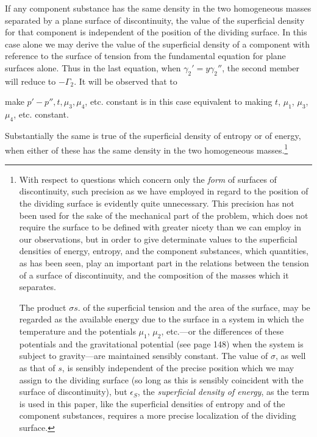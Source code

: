 \documentclass[12pt]{article}
\begin{document}
{If any component substance has the same density in the two homogeneous masses separated by a plane surface of discontinuity, the value of the superficial density for that component is independent of the position of the dividing surface. In this case alone we may derive the value of the superficial density of a component with reference to the surface of tension from the fundamental equation for plane surfaces alone. Thus in the last equation, when $\gamma_2'=y\gamma_2''$, the second member will reduce to $- \Gamma_{2}$. It will be observed that to



make $p'-p'',t,\mu_3,\mu_4$, etc. constant is in this case equivalent to making $t$, $\mu_1$, $\mu_3$, $\mu_4$, etc. constant.

Substantially the same is true of the superficial density of entropy or of energy, when either of these has the same density in the two
homogeneous masses.\footnote{With respect to questions which concern only the \textit{form} of surfaces of discontinuity, such precision as we have employed in regard to the position of the dividing surface is evidently quite unnecessary. This precision has not been used for the sake of the mechanical part of the problem, which does not require the surface to be defined with greater nicety than we can employ in our observations, but in order to give determinate values to the superficial densities of energy, entropy, and the component substances, which quantities, as has been seen, play an important part in the relations between the tension of a surface of discontinuity, and the composition of the masses which it separates.\par
The product $\sigma s$. of the superficial tension and the area of the surface, may be regarded as the available energy due to the surface in a system in which the temperature and the potentials $\mu_1$, $\mu_2$, etc.---or the differences of these potentials and the gravitational potential (see page 148) when the system is subject to gravity---are maintained sensibly constant. The value of $\sigma$, as well as that of $s$, is sensibly independent of the precise position which we may assign to the dividing surface (so long as this is sensibly coincident with the surface of discontinuity), but $\epsilon_S$, the \textit{superficial density of energy}, as the term is used in this paper, like the superficial densities of entropy and of the component substances, requires a more precise localization of the dividing surface.}

}
\end{document}
